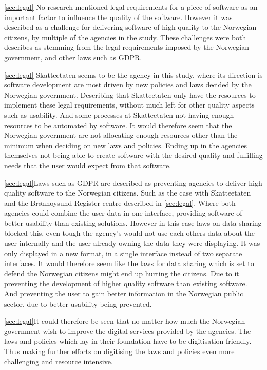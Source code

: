 \autoref{sec:legal} No research mentioned legal requirements for a piece of software as an important factor to influence the quality of the software. However it was described as a challenge for delivering software of high quality to the Norwegian citizens, by multiple of the agencies in the study. These challenges were both describes as stemming from the legal requirements imposed by the Norwegian government, and other laws such as GDPR.

\autoref{sec:legal} Skatteetaten seems to be the agency in this study, where its direction is software development are most driven by new policies and laws decided by the Norwegian government. Describing that Skatteetaten only have the resources to implement these legal requirements, without much left for other quality aspects such as usability. And some processes at Skatteetaten not having enough resources to be automated by software. It would therefore seem that the Norwegian government are not allocating enough resources other than the minimum when deciding on new laws and policies. Ending up in the agencies themselves not being able to create software with the desired quality and fulfilling needs that the user would expect from that software.

\autoref{sec:legal}Laws such as GDPR are described as preventing agencies to deliver high quality software to the Norwegian citizens. Such as the case with Skatteetaten and the Brønnoysund Register centre described in \autoref{sec:legal}. Where both agencies could combine the user data in one interface, providing software of better usability than existing solutions. However in this case laws on data-sharing blocked this, even tough the agency's would not use each others data about the user internally and the user already owning the data they were displaying. It was only displayed in a new format, in a single interface instead of two separate interfaces. It would therefore seem like the laws for data sharing which is set to defend the Norwegian citizens might end up hurting the citizens. Due to it preventing the development of higher quality software than existing software. And preventing the user to gain better information in the Norwegian public sector, due to better usability being prevented.

\autoref{sec:legal}It could therefore be seen that no matter how much the Norwegian government wish to improve the digital services provided by the agencies. The laws and policies which lay in their foundation have to be digitisation friendly. Thus making further efforts on digitising the laws and policies even more challenging and resource intensive.


